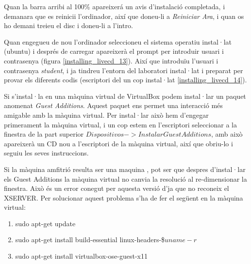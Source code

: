 Quan la barra arribi al 100\% apareixerá un avis d'instalació completada, i demanara que es reinicii l'ordinador, així que doneu-li a \emph{Reiniciar Ara}, i quan os ho demani treieu el disc i doneu-li a l'intro.

Quan engegueu de nou l'ordinador seleccioneu el sistema operatiu instal·lat (ubuntu)
i després de carregar apareixerà el prompt per introduir usuari i contrasenya (figura \ref{installing_livecd_13}).
Així que introduïu l'usuari i contrasenya \emph{student}, i ja tindreu l'entorn del laboratori instal·lat i preparat per provar els diferents codis (escriptori del \LiveCD un cop instal·lat \ref{installing_livecd_14}).



Si s'instal·la en una màquina virtual de VirtualBox podem instal·lar un paquet anomenat \emph{Guest Additions}. Aquest paquet ens permet una interacció més amigable amb la màquina virtual. Per instal·lar això hem d'engegar primerament la màquina virtual, i un cop estem en l'escriptori seleccionar a la finestra de la part superior $Dispositivos->Instalar Guest Additions$, amb això apareixerà un CD nou a l'escriptori de la màquina virtual, així que obriu-lo i seguiu les seves instruccions.


Si la màquina amfitrió resulta ser una maquina \Ubuntu, pot ser que despres d'instal·lar els Guest Additions la màquina virtual no canvia la resolució al re-dimensionar la finestra. Això és un error conegut per aquesta versió d'\Ubuntu ja que no reconeix el XSERVER. Per solucionar aquest problema s'ha de fer el següent en la màquina virtual:

\begin{enumerate}
	\item sudo apt-get update
	\item sudo apt-get install build-essential linux-headers-\$\(uname -r\)
	\item sudo apt-get install virtualbox-ose-guest-x11
\end{enumerate}

